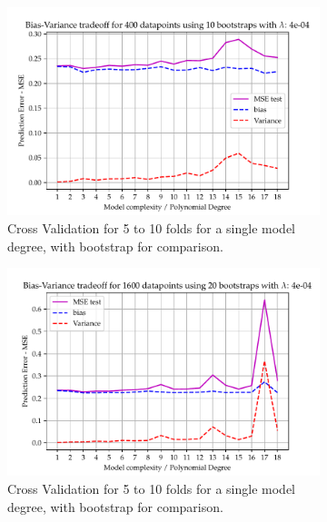 \documentclass[11pt, a4paper]{article}
\begin{document}
\begin{figure}
\begin{subfigure}{0.49\textwidth}
    \centering
    \includegraphics[width=\textwidth]{figures/EX5_lasso_complexity_using_bootstrap_function_lmb2039.pdf}
    \caption{\label{fig:boot_lasso_3}Cross Validation for 5 to 10 folds for a single model degree, with bootstrap for comparison.}
  \end{subfigure}
  \hfill
  \begin{subfigure}{0.49\textwidth}
      \centering
      \includegraphics[width=\textwidth]{figures/EX5_lasso_complexity_using_bootstrap_function_lmb4039.pdf}
      \caption{\label{fig:boot_lasso_4}Cross Validation for 5 to 10 folds for a single model degree, with bootstrap for comparison.}
  \end{subfigure}
  \hfill
  \begin{subfigure}{0.49\textwidth}
      \centering

\end{subfigure}
\end{figure}
\end{document}
